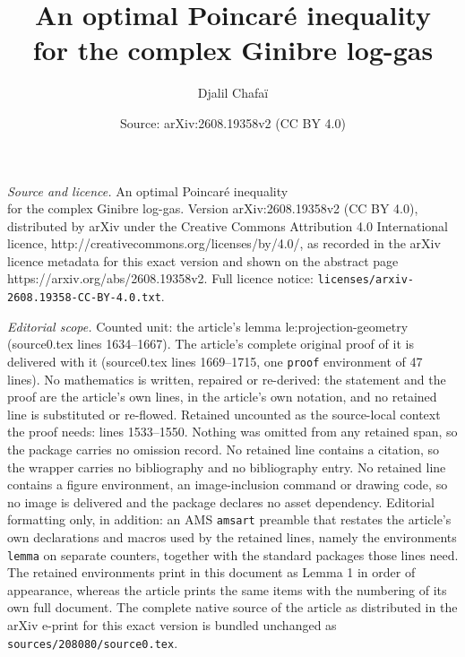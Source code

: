 \documentclass[10pt,a4paper]{amsart}
\title{An optimal Poincaré inequality\\for the complex Ginibre log-gas}
\author{Djalil Chafaï}
\date{Source: arXiv:2608.19358v2 (CC BY 4.0)}
\begin{document}
\maketitle

\noindent\emph{Source and licence.} An optimal Poincaré inequality\\for the complex Ginibre log-gas. Version arXiv:2608.19358v2 (CC BY 4.0), distributed by arXiv under the Creative Commons Attribution 4.0 International licence, http://creativecommons.org/licenses/by/4.0/, as recorded in the arXiv licence metadata for this exact version and shown on the abstract page https://arxiv.org/abs/2608.19358v2. Full licence notice: \texttt{licenses/arxiv-2608.19358-CC-BY-4.0.txt}.\par\smallskip

\noindent\textit{Editorial scope.} Counted unit: the article's lemma le:projection-geometry (source0.tex lines 1634--1667). The article's complete original proof of it is delivered with it (source0.tex lines 1669--1715, one \texttt{proof} environment of 47 lines). No mathematics is written, repaired or re-derived: the statement and the proof are the article's own lines, in the article's own notation, and no retained line is substituted or re-flowed.  Retained uncounted as the source-local context the proof needs: lines 1533--1550.  Nothing was omitted from any retained span, so the package carries no omission record.  No retained line contains a citation, so the wrapper carries no bibliography and no bibliography entry.  No retained line contains a figure environment, an image-inclusion command or drawing code, so no image is delivered and the package declares no asset dependency.  Editorial formatting only, in addition: an AMS \texttt{amsart} preamble that restates the article's own declarations and macros used by the retained lines, namely the environments \texttt{lemma} on separate counters, together with the standard packages those lines need.  The retained environments print in this document as Lemma 1 in order of appearance, whereas the article prints the same items with the numbering of its own full document.  The complete native source of the article as distributed in the arXiv e-print for this exact version is bundled unchanged as \texttt{sources/208080/source0.tex}.
\end{document}
